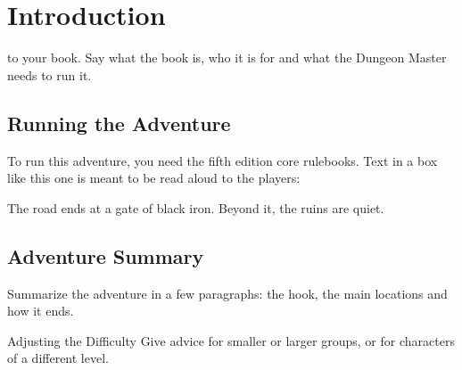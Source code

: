\chapter{Introduction}

 to your book. Say what the book is, who it is for and what the Dungeon Master needs to run it.

\section{Running the Adventure}

To run this adventure, you need the fifth edition core rulebooks. Text in a box like this one is meant to be read aloud to the players:

\begin{DndReadAloud}
  The road ends at a gate of black iron. Beyond it, the ruins are quiet.
\end{DndReadAloud}

\section{Adventure Summary}

Summarize the adventure in a few paragraphs: the hook, the main locations and how it ends.

\begin{DndSidebar}{Adjusting the Difficulty}
  Give advice for smaller or larger groups, or for characters of a different level.
\end{DndSidebar}

